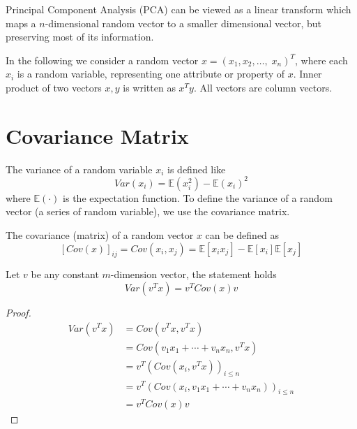 





\maketitle

Principal Component Analysis (PCA) can be viewed as a linear transform which maps a $n$-dimensional random vector to a smaller dimensional vector, but preserving most of its information.

In the following we consider a random vector $x=(x_1, x_2, \dots,\; x_n)^T$, where each $x_i$ is a random variable, representing one attribute or property of $x$. Inner product of two vectors $x, y$ is written as $x^Ty$. All vectors are column vectors.

\section{Covariance Matrix}

The variance of a random variable $x_i$ is defined like
\[
	Var(x_i) = \mathbb{E}(x_i^2) - \mathbb{E}(x_i)^2
\]
where $\mathbb{E}(\cdot)$ is the expectation function. To define the variance of a random vector (a series of random variable), we use the covariance matrix.

The covariance (matrix) of a random vector $x$ can be defined as
\[
	[Cov(x)]_{ij} = Cov(x_i, x_j) =  \mathbb{E}[x_ix_j] - \mathbb{E}[x_i]\mathbb{E}[x_j]
\]


\begin{theorem}
\label{thm-1}
Let $v$ be any constant $m$-dimension vector, the statement holds
\[
	Var(v^Tx)=v^T Cov(x) v
\]
\end{theorem}

\begin{proof}

\begin{align*}
	Var(v^Tx)
	&= Cov(v^Tx, v^Tx) \\
	&= Cov(v_1x_1+\cdots+v_nx_n, v^Tx) \\
	&= v^T\left( Cov(x_i, v^Tx) \right)_{i\leq n} \\
	&= v^T\left( Cov(x_i, v_1x_1+\cdots+v_nx_n) \right)_{i\leq n} \\
	&= v^T Cov(x) v
\end{align*}

\end{proof}

